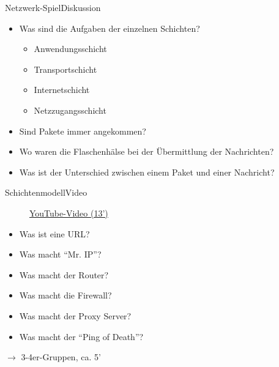 \begin{frame}{Netzwerk-Spiel}{Diskussion}
    \begin{itemize}[<+->]
        \item Was sind die Aufgaben der einzelnen Schichten?
              \begin{itemize}
                  \item Anwendungsschicht
                  \item Transportschicht
                  \item Internetschicht
                  \item Netzzugangsschicht
              \end{itemize}
        \item Sind Pakete immer angekommen?
        \item Wo waren die Flaschenhälse bei der Übermittlung der Nachrichten?
        \item Was ist der Unterschied zwischen einem Paket und einer Nachricht?
    \end{itemize}
\end{frame}



\begin{frame}[fragile]{Schichtenmodell}{Video}
    \begin{figure}[H]
        \href{https://www.youtube.com/watch?v=PBWhzz_Gn10}{YouTube-Video (13')}
    \end{figure}

    \begin{myexercise}
        \begin{itemize}
            \item Was ist eine \acrshort{URL}?
            \item Was macht \enquote{Mr. \acrshort{IP}}?
            \item Was macht der Router?
            \item Was macht die Firewall?
            \item Was macht der Proxy Server?
            \item Was macht der \enquote{Ping of Death}? \faSkull
        \end{itemize}
        $\rightarrow$ 3-4er-Gruppen, ca. 5'
    \end{myexercise}
\end{frame}

